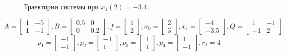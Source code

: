 \documentclass[10pt]{article}
\begin{document}
\begin{figure}[h!]
	\caption*{Траектории системы при \( x_1(2) = -3.4 \).}
\end{figure}
\newpage
 \[ A = \begin{bmatrix}
      		1 & -5 \\[0.3em]
      		1 & -1
      	  \end{bmatrix} , 
 B = \begin{bmatrix}
      	   0.5 & 0 \\[0.3em]
      	   0 & 0.2
      \end{bmatrix} ,
 f = \begin{bmatrix}
       	    1 \\[0.3em]
      	    2
      \end{bmatrix} ,
 x_0 = \begin{bmatrix}
      	    2 \\[0.3em]
      	    3
      \end{bmatrix} ,
 x_1 = \begin{bmatrix}
      	-4 \\[0.3em]
      	-3.5
      \end{bmatrix} ,
 Q = \begin{bmatrix}
      	   1 & -1 \\[0.3em]
      	   -1 & 2
      \end{bmatrix} \]
\[ p_1 = \begin{bmatrix}
      	-1 \\[0.3em]
      	-1
      \end{bmatrix} ,
p_2 = \begin{bmatrix}
      	-1 \\[0.3em]
      	1
      \end{bmatrix} ,
p_3 = \begin{bmatrix}
      	1 \\[0.3em]
      	1
      \end{bmatrix} ,
p_4 = \begin{bmatrix}
      	1 \\[0.3em]
      	-1
      \end{bmatrix}, r_1 = 4 \]
\end{document}
